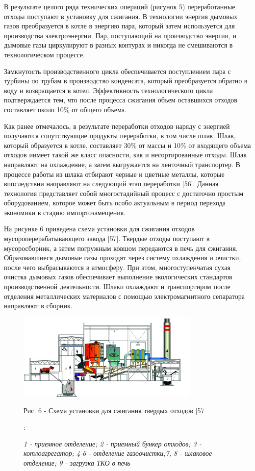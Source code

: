 \begin{multicols}{2}
В результате целого ряда технических операций (рисунок 5) переработанные
отходы поступают в установку для сжигания. В технологии энергия дымовых
газов преобразуется в котле в энергию пара, который затем используется
для производства электроэнергии. Пар, поступающий на производство
энергии, и дымовые газы циркулируют в разных контурах и никогда не
смешиваются в технологическом процессе.

Замкнутость производственного цикла обеспечивается поступлением пара с
турбины по трубам в производство конденсата, который преобразуется
обратно в воду и возвращается в котел. Эффективность технологического
цикла подтверждается тем, что после процесса сжигания объем оставшихся
отходов составляет около 10\% от общего объема.

Как ранее отмечалось, в результате переработки отходов наряду с энергией
получаются сопутствующие продукты переработки, в том числе шлак. Шлак,
который образуется в котле, составляет 30\% от массы и 10\% от входящего
объема отходов иимеет такой же класс опасности, как и несортированные
отходы. Шлак направляют на охлаждение, а затем выгружается на ленточный
транспортер. В процессе работы из шлака отбирают черные и цветные
металлы, которые впоследствии направляют на следующий этап переработки
{[}56{]}. Данная технология представляет собой многостадийный процесс с
достаточно простым оборудованием, которое может быть особо актуальным в
период перехода экономики в стадию импортозамещения.

На рисунке 6 приведена схема установки для сжигания отходов
мусороперерабатывающего завода {[}57{]}. Твердые отходы поступают в
мусоросборник, а затем погружным ковшом передаются в печь для сжигания.
Образовавшиеся дымовые газы проходят через систему охлаждения и очистки,
после чего выбрасываются в атмосферу. При этом, многоступенчатая сухая
очистка дымовых газов обеспечивает выполнение экологических стандартов
производственной деятельности. Шлаки охлаждают и транспортиром после
отделения металлических материалов с помощью электромагнитного
сепаратора направляют в сборник.
\end{multicols}

\begin{figure}[H]
	\centering
	\includegraphics[width=0.8\textwidth]{media/chem2/image69}
	\caption*{Рис. 6 - Схема установки для сжигания твердых отходов {[}57}
	\caption*{\normalfont\emph{1 - приемное отделение; 2 - приемный бункер отходов; 3 -
котлоагрегатор; 4-6 - отделение газоочистки;7, 8 - шлаковое отделение; 9
- загрузка ТКО в печь}}:
\end{figure}

